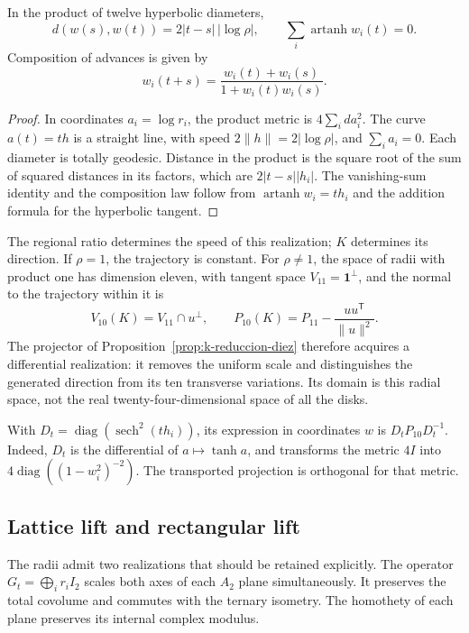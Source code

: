 \begin{theorem}
\label{rec:thm:geodesica}
In the product of twelve hyperbolic diameters,
\begin{equation}
 d(w(s),w(t))=2|t-s|\,|\log\rho|,\qquad
 \sum_i\operatorname{artanh}w_i(t)=0.
 \label{rec:eq:geodesica}
\end{equation}
Composition of advances is given by
\[
 w_i(t+s)=\frac{w_i(t)+w_i(s)}{1+w_i(t)w_i(s)}.
\]
\end{theorem}
\begin{proof}
In coordinates \(a_i=\log r_i\), the product metric is \(4\sum_i da_i^2\). The curve \(a(t)=th\) is a straight line, with speed \(2\|h\|=2|\log\rho|\), and \(\sum_i a_i=0\). Each diameter is totally geodesic. Distance in the product is the square root of the sum of squared distances in its factors, which are \(2|t-s||h_i|\). The vanishing-sum identity and the composition law follow from \(\operatorname{artanh}w_i=th_i\) and the addition formula for the hyperbolic tangent.
\end{proof}

The regional ratio determines the speed of this realization; \(K\) determines its direction. If \(\rho=1\), the trajectory is constant. For \(\rho\ne1\), the space of radii with product one has dimension eleven, with tangent space \(V_{11}=\mathbf1^\perp\), and the normal to the trajectory within it is
\[
 V_{10}(K)=V_{11}\cap u^\perp,\qquad
 P_{10}(K)=P_{11}-\frac{uu^{\mathsf T}}{\|u\|^2}.
\]
The projector of Proposition~\ref{prop:k-reduccion-diez} therefore acquires a differential realization: it removes the uniform scale and distinguishes the generated direction from its ten transverse variations. Its domain is this radial space, not the real twenty-four-dimensional space of all the disks.

With \(D_t=\operatorname{diag}(\operatorname{sech}^2(th_i))\), its expression in coordinates \(w\) is \(D_tP_{10}D_t^{-1}\). Indeed, \(D_t\) is the differential of \(a\mapsto\tanh a\), and transforms the metric \(4I\) into \(4\operatorname{diag}((1-w_i^2)^{-2})\). The transported projection is orthogonal for that metric.

\subsection{Lattice lift and rectangular lift}

The radii admit two realizations that should be retained explicitly. The operator \(G_t=\bigoplus_i r_iI_2\) scales both axes of each \(A_2\) plane simultaneously. It preserves the total covolume and commutes with the ternary isometry. The homothety of each plane preserves its internal complex modulus.

